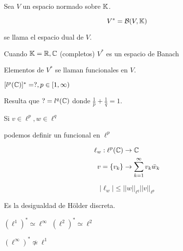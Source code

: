 \documentclass[../Apunte.tex]{subfiles}
\begin{document}
    \begin{fdefinition}
        Sea $V$ un espacio normado sobre $\mathbb{K}$.

        \[V^*=\mathcal{B}(V,\mathbb{K})\]

        se llama el espacio \color{red} dual \color{black} de $V$.
    \end{fdefinition}

    \begin{ftheorem}
        Cuando $\mathbb{K}=\mathbb{R},\mathbb{C}$ (completos) $V^*$ es un espacio de Banach
    \end{ftheorem}

    Elementos de $V^*$ se llaman \color{red} funcionales \color{black} en $V$.


    \begin{fexample}
        $[l^p(\mathbb{C})]^* =?,p\in[1,\infty)$

        Resulta que $?=l^q(\mathbb{C})$ donde $\frac{1}{p}+\frac{1}{q}=1$.

        Si $v\in \ell^p,w\in\ell^q$

        podemos definir un funcional en $\ell^p$

        \begin{align*}\ell_w:\ell^p(\mathbb{C})&\to\mathbb{C}\\
        v=\{v_k\}&\to \sum_{k=1}^\infty v_k\bar w_k\end{align*}

        \[|\ell_w|\leq ||w||_{\ell^q}||v||_{\ell^p}\]

        Es la desigualdad de Hölder discreta.
    \end{fexample}

    $(\ell^1)^*\simeq \ell^\infty$
    $(\ell^2)^*\simeq \ell^2$

    \begin{fnote}
        $(\ell^\infty)^*\not\simeq \ell^1$
    \end{fnote}
\end{document}
